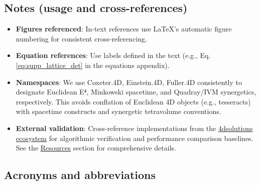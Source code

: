 \documentclass[
  10pt,
]{article}
\providecommand{\tightlist}{%
  \setlength{\itemsep}{0pt}\setlength{\parskip}{0pt}}
\begin{document}
\hypertarget{notes-usage-and-cross-references}{%
\subsection{Notes (usage and
cross-references)}\label{notes-usage-and-cross-references}}

\begin{itemize}
\tightlist
\item
  \textbf{Figures referenced}: In-text references use LaTeX's automatic
  figure numbering for consistent cross-referencing.
\item
  \textbf{Equation references}: Use labels defined in the text (e.g.,
  Eq. \eqref{eq:supp_lattice_det} in the equations appendix).
\item
  \textbf{Namespaces}: We use Coxeter.4D, Einstein.4D, Fuller.4D
  consistently to designate Euclidean E⁴, Minkowski spacetime, and
  Quadray/IVM synergetics, respectively. This avoids conflation of
  Euclidean 4D objects (e.g., tesseracts) with spacetime constructs and
  synergetic tetravolume conventions.
\item
  \textbf{External validation}: Cross-reference implementations from the
  \href{https://github.com/4dsolutions}{4dsolutions ecosystem} for
  algorithmic verification and performance comparison baselines. See the
  \href{07_resources.md}{Resources} section for comprehensive details.
\end{itemize}

\hypertarget{acronyms-and-abbreviations}{%
\subsection{Acronyms and
abbreviations}\label{acronyms-and-abbreviations}}
\end{document}

